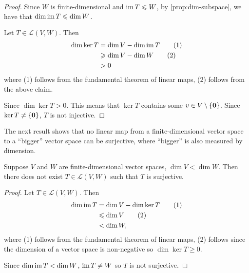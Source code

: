 \begin{proof}
Since $W$ is finite-dimensional and $\operatorname{im} T\leqslant W$, by \cref{prop:dim-subspace}, we have that $\dim\operatorname{im} T\leqslant\dim W$.

Let $T\in\mathcal{L}(V,W)$. Then
\begin{align*}
\dim\ker T&=\dim V-\dim\operatorname{im} T\tag{1}\\
&\geqslant\dim V-\dim W\tag{2}\\
&>0
\end{align*}
where (1) follows from the fundamental theorem of linear maps, (2) follows from the above claim.

Since $\dim\ker T>0$. This means that $\ker T$ contains some $v\in V\setminus\{\vb{0}\}$. Since $\ker T\neq\{\vb{0}\}$, $T$ is not injective.
\end{proof}

The next result shows that no linear map from a finite-dimensional vector space to a ``bigger'' vector space can be surjective, where ``bigger'' is also measured by dimension.

\begin{proposition}
Suppose $V$ and $W$ are finite-dimensional vector spaces, $\dim V<\dim W$. Then there does not exist $T\in\mathcal{L}(V,W)$ such that $T$ is surjective.
\end{proposition}

\begin{proof}
Let $T\in\mathcal{L}(V,W)$. Then
\begin{align*}
\dim\operatorname{im} T&=\dim V-\dim\ker T\tag{1}\\
&\leqslant\dim V\tag{2}\\
&<\dim W,
\end{align*}
where (1) follows from the fundamental theorem of linear maps, (2) follows since the dimension of a vector space is non-negative so $\dim\ker T\ge0$.

Since $\dim\operatorname{im} T<\dim W$, $\operatorname{im} T\neq W$ so $T$ is not surjective.
\end{proof}


